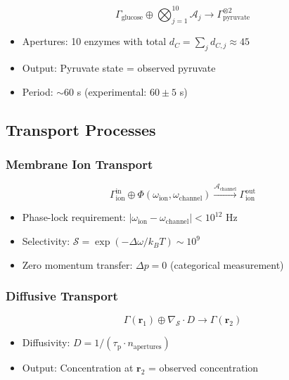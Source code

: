 \documentclass[aps,prd,twocolumn,superscriptaddress,floatfix,nofootinbib]{revtex4-2}
\theoremstyle{remark}
\newcommand{\Sspace}{\mathcal{S}}
\newcommand{\Gstate}{\Gamma}
\newcommand{\taulag}{\tau_{\mathrm{p}}}
\begin{document}
\begin{equation}
\Gstate_{\text{glucose}} \oplus \bigotimes_{j=1}^{10} \mathcal{A}_j \to \Gstate_{\text{pyruvate}}^{\otimes 2}
\end{equation}

\begin{itemize}
\item Apertures: 10 enzymes with total $d_C = \sum_j d_{C,j} \approx 45$~\cite{nelson2017}
\item Output: Pyruvate state = observed pyruvate
\item Period: $\sim 60$ s (experimental: $60 \pm 5$ s)~\cite{hess1971}
\end{itemize}

\subsection{Transport Processes}

\subsubsection{Membrane Ion Transport}

\begin{equation}
\Gstate_{\text{ion}}^{\text{in}} \oplus \Phi(\omega_{\text{ion}}, \omega_{\text{channel}}) \xrightarrow{\mathcal{A}_{\text{channel}}} \Gstate_{\text{ion}}^{\text{out}}
\end{equation}

\begin{itemize}
\item Phase-lock requirement: $|\omega_{\text{ion}} - \omega_{\text{channel}}| < 10^{12}$ Hz~\cite{hille2001}
\item Selectivity: $\mathcal{S} = \exp(-\Delta\omega / k_B T) \sim 10^9$~\cite{doyle1998,mackinnon2003}
\item Zero momentum transfer: $\Delta p = 0$ (categorical measurement)
\end{itemize}

\subsubsection{Diffusive Transport}

\begin{equation}
\Gstate(\mathbf{r}_1) \oplus \nabla_{\Sspace} \cdot D \to \Gstate(\mathbf{r}_2)
\end{equation}

\begin{itemize}
\item Diffusivity: $D = 1/(\taulag \cdot n_{\text{apertures}})$
\item Output: Concentration at $\mathbf{r}_2$ = observed concentration
\end{itemize}
\end{document}
